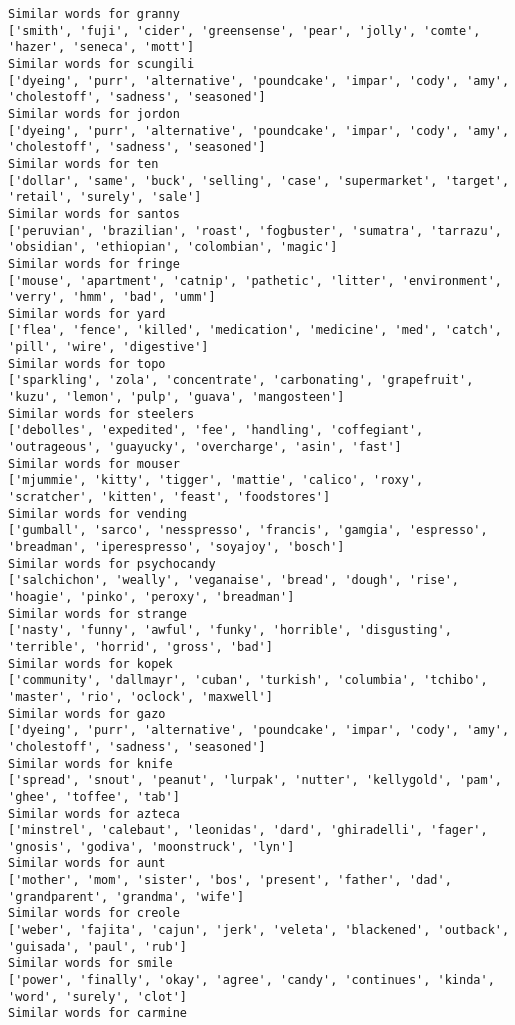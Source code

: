 \documentclass[11pt]{article}
\begin{document}
\begin{Verbatim}[commandchars=\\\{\}]
Similar words for granny
['smith', 'fuji', 'cider', 'greensense', 'pear', 'jolly', 'comte', 'hazer', 'seneca', 'mott']
Similar words for scungili
['dyeing', 'purr', 'alternative', 'poundcake', 'impar', 'cody', 'amy', 'cholestoff', 'sadness', 'seasoned']
Similar words for jordon
['dyeing', 'purr', 'alternative', 'poundcake', 'impar', 'cody', 'amy', 'cholestoff', 'sadness', 'seasoned']
Similar words for ten
['dollar', 'same', 'buck', 'selling', 'case', 'supermarket', 'target', 'retail', 'surely', 'sale']
Similar words for santos
['peruvian', 'brazilian', 'roast', 'fogbuster', 'sumatra', 'tarrazu', 'obsidian', 'ethiopian', 'colombian', 'magic']
Similar words for fringe
['mouse', 'apartment', 'catnip', 'pathetic', 'litter', 'environment', 'verry', 'hmm', 'bad', 'umm']
Similar words for yard
['flea', 'fence', 'killed', 'medication', 'medicine', 'med', 'catch', 'pill', 'wire', 'digestive']
Similar words for topo
['sparkling', 'zola', 'concentrate', 'carbonating', 'grapefruit', 'kuzu', 'lemon', 'pulp', 'guava', 'mangosteen']
Similar words for steelers
['debolles', 'expedited', 'fee', 'handling', 'coffegiant', 'outrageous', 'guayucky', 'overcharge', 'asin', 'fast']
Similar words for mouser
['mjummie', 'kitty', 'tigger', 'mattie', 'calico', 'roxy', 'scratcher', 'kitten', 'feast', 'foodstores']
Similar words for vending
['gumball', 'sarco', 'nesspresso', 'francis', 'gamgia', 'espresso', 'breadman', 'iperespresso', 'soyajoy', 'bosch']
Similar words for psychocandy
['salchichon', 'weally', 'veganaise', 'bread', 'dough', 'rise', 'hoagie', 'pinko', 'peroxy', 'breadman']
Similar words for strange
['nasty', 'funny', 'awful', 'funky', 'horrible', 'disgusting', 'terrible', 'horrid', 'gross', 'bad']
Similar words for kopek
['community', 'dallmayr', 'cuban', 'turkish', 'columbia', 'tchibo', 'master', 'rio', 'oclock', 'maxwell']
Similar words for gazo
['dyeing', 'purr', 'alternative', 'poundcake', 'impar', 'cody', 'amy', 'cholestoff', 'sadness', 'seasoned']
Similar words for knife
['spread', 'snout', 'peanut', 'lurpak', 'nutter', 'kellygold', 'pam', 'ghee', 'toffee', 'tab']
Similar words for azteca
['minstrel', 'calebaut', 'leonidas', 'dard', 'ghiradelli', 'fager', 'gnosis', 'godiva', 'moonstruck', 'lyn']
Similar words for aunt
['mother', 'mom', 'sister', 'bos', 'present', 'father', 'dad', 'grandparent', 'grandma', 'wife']
Similar words for creole
['weber', 'fajita', 'cajun', 'jerk', 'veleta', 'blackened', 'outback', 'guisada', 'paul', 'rub']
Similar words for smile
['power', 'finally', 'okay', 'agree', 'candy', 'continues', 'kinda', 'word', 'surely', 'clot']
Similar words for carmine

\end{Verbatim}
\end{document}

